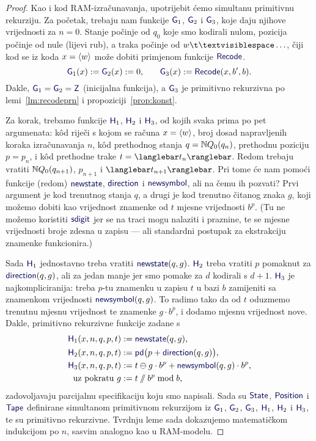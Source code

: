\begin{proof}
Kao i kod RAM-izračunavanja, upotrijebit ćemo simultanu primitivnu rekurziju. Za početak, trebaju nam funkcije $\f G_1$, $\f G_2$ i $\f G_3$, koje daju njihove vrijednosti za $n=0$. Stanje počinje od $q_0$ koje smo kodirali nulom, pozicija počinje od nule (lijevi rub), a traka počinje od $w\bl\ldots$, čiji kod se iz koda $x=\langle w\rangle$ može dobiti primjenom funkcije $\f{Recode}$.
\begin{equation}
    \f G_1(x):=\f G_2(x):=0\text,\qquad
    \f G_3(x):=\f{Recode}(x,b',b)\text.
\end{equation}
Dakle, $\f G_1=\f G_2=\f Z$ (inicijalna funkcija), a $\f G_3$ je primitivno rekurzivna po lemi~\ref{lm:recodeprn} i propoziciji~\ref{prop:konst}.

Za korak, trebamo funkcije $\f H_1$, $\f H_2$ i $\f H_3$, od kojih svaka prima po pet argumenata: k\^od riječi s kojom se računa $x=\langle w\rangle$, broj dosad napravljenih koraka izračunavanja $n$, k\^od prethodnog stanja $q={\mathbb N} Q_0(q_n)$, prethodnu poziciju $p=p_n$, i k\^od prethodne trake $t=\knk{t_n}$. Redom trebaju vratiti ${\mathbb N} Q_0(q_{n+1})$, $p_{n+1}$ i $\knk{t_{n+1}}$. Pri tome će nam pomoći funkcije (redom) $\f{newstate}$, $\f{direction}$ i $\f{newsymbol}$, ali na čemu ih pozvati? Prvi argument je kod trenutnog stanja $q$, a drugi je kod trenutno čitanog znaka $g$, koji možemo dobiti kao vrijednost znamenke od $t$ mjesne vrijednosti $b^p$. (Tu ne možemo koristiti $\f{sdigit}$ jer se na traci mogu nalaziti i praznine, te se mjesne vrijednosti broje zdesna u zapisu --- ali standardni postupak za ekstrakciju znamenke funkcionira.)

Sada $\f H_1$ jednostavno treba vratiti $\f{newstate}(q,g)$. $\f H_2$ treba vratiti $p$ pomaknut za $\f{direction}(q,g)$, ali za jedan manje jer smo pomake za $d$ kodirali s $d+1$. $\f H_3$ je najkompliciranija: treba $p$-tu znamenku u zapisu $t$ u bazi $b$ zamijeniti sa znamenkom vrijednosti $\f{newsymbol}(q,g)$. To radimo tako da od $t$ oduzmemo trenutnu mjesnu vrijednost te znamenke $g\cdot b^p$, i dodamo mjesnu vrijednost nove. Dakle, primitivno rekurzivne funkcije zadane s
\begin{align}
    \f H_1(x,n,q,p,t)&:=\f{newstate}(q,g)\text,\\
    \f H_2(x,n,q,p,t)&:=\f{pd}\bigl(p+\f{direction}(q,g)\bigr)\text,\\
    \f H_3(x,n,q,p,t)&:=t\ominus g\cdot b^p+\f{newsymbol}(q,g)\cdot b^p\text,\\
    \text{uz pokratu }g&:=t\sslash b^p\bmod b\text,
\end{align}
zadovoljavaju parcijalnu specifikaciju koju smo napisali. Sada su $\f{State}$, $\f{Position}$ i $\f{Tape}$ definirane simultanom primitivnom rekurzijom iz $\f G_1$, $\f G_2$, $\f G_3$, $\f H_1$, $\f H_2$ i $\f H_3$, te su primitivno rekurzivne. Tvrdnju leme sada dokazujemo matematičkom indukcijom po $n$, sasvim analogno kao u RAM-modelu.


\end{proof}
